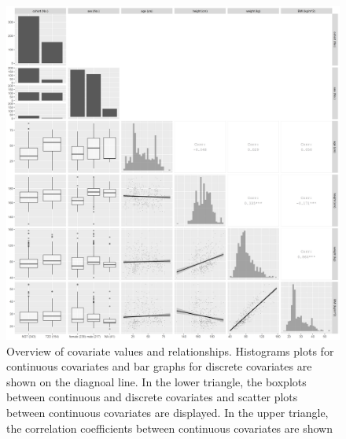 \documentclass[utf8]{frontiersSCNS} %
\begin{document}
\begin{figure}[h!]
\begin{center}
\includegraphics[width=15cm]{p2.PNG}
\end{center}
\caption{Overview of covariate values and relationships. Histograms plots for continuous covariates and bar graphs for discrete covariates are shown on the diagnoal line. In the lower triangle, the boxplots between continuous and discrete covariates and scatter plots between continuous covariates are displayed. In the upper triangle, the correlation coefficients between continuous covariates are shown}
\label{fig: cova}
\end{figure}
\end{document}
